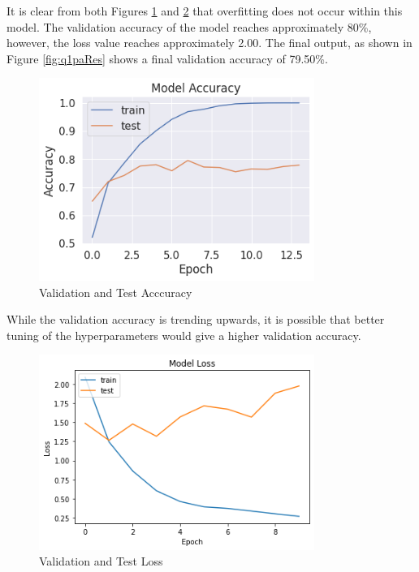 It is clear from both Figures \ref{fig:q1paAcc} and \ref{fig:q1paLoss} that
overfitting does not occur within this model. The validation accuracy of the
model reaches approximately 80\%, however, the loss value reaches approximately
2.00. The final output, as shown in Figure \ref{fig:q1paRes} shows a final
validation accuracy of 79.50\%.

\begin{figure}[H]
	\centering
	\includegraphics[width=0.8\textwidth]{images/q1/pa/accuracy}
	\caption{Validation and Test Acccuracy}
	\label{fig:q1paAcc}
\end{figure}

While the validation accuracy is trending upwards, it is possible that better
tuning of the hyperparameters would give a higher validation accuracy.

\begin{figure}[H]
	\centering
	\includegraphics[width=0.8\textwidth]{images/q1/pa/loss}
	\caption{Validation and Test Loss}
	\label{fig:q1paLoss}
\end{figure}

